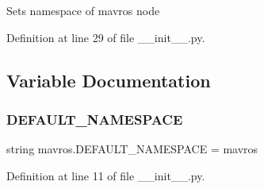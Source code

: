 \begin{DoxyVerb}Sets namespace of mavros node
\end{DoxyVerb}
 

Definition at line 29 of file \+\_\+\+\_\+init\+\_\+\+\_\+.\+py.



\subsection{Variable Documentation}
\mbox{\label{namespacemavros_a8507dfceb913a3fedcc98b864e82f2ab}} 
\subsubsection{\texorpdfstring{DEFAULT\_NAMESPACE}{DEFAULT\_NAMESPACE}}
{\footnotesize\ttfamily string mavros.\+D\+E\+F\+A\+U\+L\+T\+\_\+\+N\+A\+M\+E\+S\+P\+A\+CE = \textquotesingle{}mavros\textquotesingle{}}



Definition at line 11 of file \+\_\+\+\_\+init\+\_\+\+\_\+.\+py.

